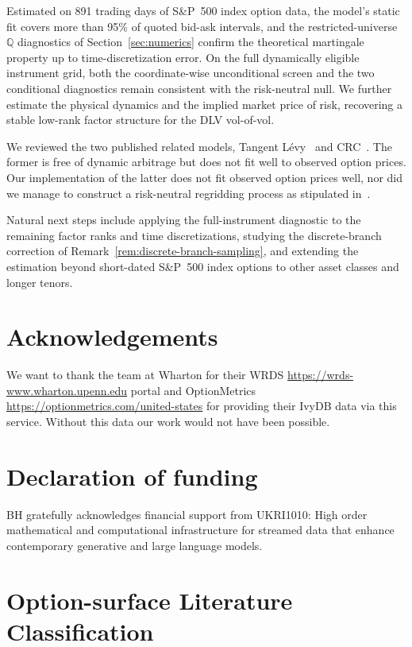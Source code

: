 \documentclass[smallextended,envcountsame,envcountsect]{svjour3}
\newcommand{\Q}{\mathbb Q}
\begin{document}
Estimated on 891 trading days of S\&P~500 index option data, the model's static fit covers more
than 95\% of quoted bid-ask intervals, and the restricted-universe $\Q$ diagnostics of
Section~\ref{sec:numerics} confirm the theoretical martingale property up to time-discretization
error.  On the full dynamically eligible instrument grid, both the
coordinate-wise unconditional screen and the two conditional
diagnostics remain consistent with the risk-neutral null.
We further estimate the physical dynamics and the implied market price of risk, recovering a
stable low-rank factor structure for the DLV vol-of-vol.

We reviewed the two published related models, Tangent L\'evy~\citep{TangentLevy} and CRC~\citep{DysLitGambaraTeichmann2021}. The former is free of dynamic arbitrage
but does not fit well to observed option prices. Our implementation of the latter does not fit observed option prices
well, nor did we manage to construct a risk-neutral regridding process as stipulated in~\citet{DysLitGambaraTeichmann2021}.

Natural next steps include applying the full-instrument diagnostic to the
remaining factor ranks and time discretizations, studying the discrete-branch
correction of Remark~\ref{rem:discrete-branch-sampling}, and extending
the estimation beyond short-dated S\&P~500 index options to other asset classes and longer
tenors.

\section*{Acknowledgements}

We want to thank the team at Wharton for their WRDS \url{https://wrds-www.wharton.upenn.edu} portal and OptionMetrics \url{https://optionmetrics.com/united-states} 
for providing their IvyDB data via this service. Without this data our work would not have been possible.

\section*{Declaration of funding}
BH gratefully acknowledges financial support from UKRI1010: High order mathematical and computational infrastructure for streamed data that enhance contemporary generative and large language models.



\appendix




\clearpage
\section{Option-surface Literature Classification}
\label{app:literature-classification}
\def\GROMMpaper{}%




\end{document}
